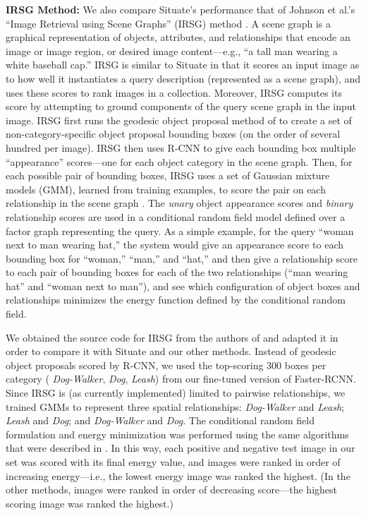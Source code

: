 \documentclass[conference]{IEEEtran}
\begin{document}
{\bf IRSG Method:} We also compare Situate's performance that of
Johnson et al.'s ``Image Retrieval using Scene Graphs'' (IRSG) method
\cite{Johnson2015a}.  A scene graph is a graphical representation of
objects, attributes, and relationships that encode an image or image
region, or desired image content---e.g., ``a tall man wearing a white
baseball cap.''  IRSG is similar to Situate in that it scores an input
image as to how well it instantiates a query description (represented
as a scene graph), and uses these scores to rank images in a
collection.  Moreover, IRSG computes its score by attempting to ground
components of the query scene graph in the input image.  IRSG first
runs the geodesic object proposal method of \cite{Krahenbuhl2014} to
create a set of non-category-specific object proposal bounding boxes
(on the order of several hundred per image).  IRSG then uses R-CNN
\cite{Girshick2014} to give each bounding box multiple ``appearance''
scores---one for each object category in the scene graph.  Then, for
each possible pair of bounding boxes, IRSG uses a set of Gaussian
mixture models (GMM), learned from training examples, to score the
pair on each relationship in the scene graph .  The {\it unary} object
appearance scores and {\it binary} relationship scores are used in a
conditional random field model defined over a factor graph
representing the query.  As a simple example, for the query ``woman
next to man wearing hat,'' the system would give an appearance score
to each bounding box for ``woman,'' ``man,'' and ``hat,'' and then
give a relationship score to each pair of bounding boxes for each of
the two relationships (``man wearing hat'' and ``woman next to man''),
and see which configuration of object boxes and relationships
minimizes the energy function defined by the conditional random field.

We obtained the source code for IRSG from the authors of
\cite{Johnson2015a} and adapted it in order to compare it with Situate
and our other methods.  Instead of geodesic object proposals scored by
R-CNN, we used the top-scoring 300 boxes per category ({\it
  Dog-Walker}, {\it Dog}, {\it Leash}) from our fine-tuned version of
Faster-RCNN.  Since IRSG is (as currently implemented) limited to
pairwise relationships, we trained GMMs to represent three spatial
relationships: {\it Dog-Walker} and {\it Leash}; {\it Leash} and {\it Dog}; and {\it Dog-Walker}
and {\it Dog}.  The conditional random field formulation and energy
minimization was performed using the same algorithms that were
described in \cite{Johnson2015a}.  In this way, each positive and
negative test image in our set was scored with its final energy value,
and images were ranked in order of increasing energy---i.e., the
lowest energy image was ranked the highest.  (In the other methods,
images were ranked in order of decreasing score---the highest scoring
image was ranked the highest.)
\end{document}
